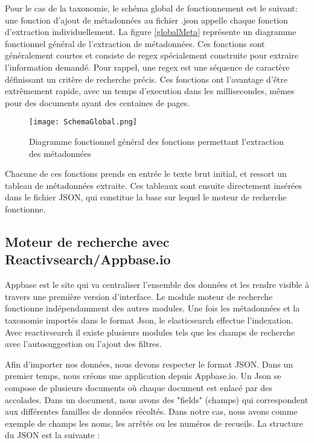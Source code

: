 Pour le cas de la taxonomie, le schéma global de fonctionnement est le suivant: une fonction d'ajout de métadonnées au fichier .json appelle chaque fonction d'extraction individuellement.
La figure \ref{globalMeta} représente un diagramme fonctionnel général de l'extraction de métadonnées. 
Ces fonctions sont généralement courtes et consiste de regex spécialement construite pour extraire l'information demandé.
Pour rappel, une regex est une séquence de caractère définissant un critère de recherche précis.
Ces fonctions ont l'avantage d'être extrêmement rapide, avec un temps d'execution dans les millisecondes, mêmes pour des documents ayant des centaines de pages. 

\begin{figure}[h!]
  \centering
	\texttt{[image: SchemaGlobal.png]}
	\caption[]{Diagramme fonctionnel général des fonctions permettant l'extraction des métadonnées}
  \label{fig:globalMeta}
\end{figure}

Chacune de ces fonctions prends en entrée le texte brut initial, et ressort un tableau de métadonnées extraite.
Ces tableaux sont ensuite directement insérées dans le fichier JSON, qui constitue la base sur lequel le moteur de recherche fonctionne.



\subsection{Moteur de recherche avec Reactivsearch/Appbase.io}
Appbase est le site qui va centraliser l'ensemble des données et les rendre visible à travers une première version d'interface.
Le module moteur de recherche fonctionne indépendamment des autres modules. Une fois les métadonnées et la taxonomie importés dans le format Json, le elasticsearch effectue l'indexation. Avec reactivsearch il existe plusieurs modules tels que les champs de recherche avec l'autosuggestion ou l'ajout des filtres.  

Afin d'importer nos données, nous devons respecter le format JSON.
Dans un premier temps, nous créons une application depuis Appbase.io. 
Un Json se compose de plusieurs documents où chaque document est enlacé par des accolades. Dans un document, nous avons des "fields" (champs) qui correspondent aux différentes familles de données récoltés. Dans notre cas, nous avons comme exemple de champs les noms, les arrêtés ou les numéros de recueils. La structure du JSON est la suivante :


